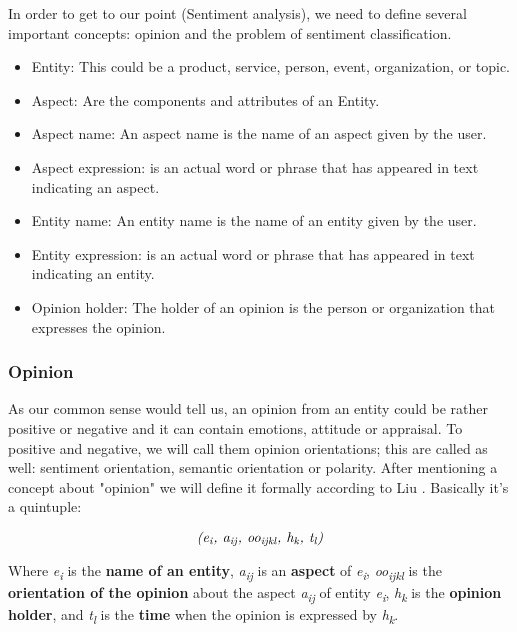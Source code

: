 In order to get to our point (Sentiment analysis), we need to define several important concepts: opinion and the problem of sentiment classification.

\begin{itemize}
	\item Entity: This could be a product, service, person, event, organization, or topic.
	\item Aspect: Are the components and attributes of an Entity.
	\item Aspect name: An aspect name is the name of an aspect given by the user.
	\item Aspect expression: is an actual word or phrase that has appeared in text indicating an aspect.
	\item Entity name: An entity name is the name of an entity given by the user.
	\item Entity expression: is an actual word or phrase that has appeared in text indicating an entity.
	\item Opinion holder: The holder of an opinion is the person or organization that expresses the opinion.
\end{itemize}

\subsubsection{Opinion}\label{opinion}
As our common sense would tell us, an opinion from an entity could be rather positive or negative and it can contain emotions, attitude or appraisal.
To positive and negative, we will call them opinion orientations; this are called as well: sentiment orientation, semantic orientation or polarity.
After mentioning a concept about "opinion" we will define it formally according to Liu \cite[p. 463]{L2011}. Basically it's a quintuple:

\begin{equation} \label{eq:opinionQuintuple}
	\textit{(e\textsubscript{i}, a\textsubscript{ij}, oo\textsubscript{ijkl}, h\textsubscript{k}, t\textsubscript{l})}
\end{equation}


Where \emph{e\textsubscript{i}} is the \textbf{name of an entity}, \emph{a\textsubscript{ij}} is an \textbf{aspect} of \emph{e\textsubscript{i}}, \emph{oo\textsubscript{ijkl}} is the \textbf{orientation of the opinion} about the aspect \emph{a\textsubscript{ij}} of entity \emph{e\textsubscript{i}}, \emph{h\textsubscript{k}} is the \textbf{opinion holder}, and \emph{t\textsubscript{l}} is the \textbf{time} when the opinion is expressed by \emph{h\textsubscript{k}}.


